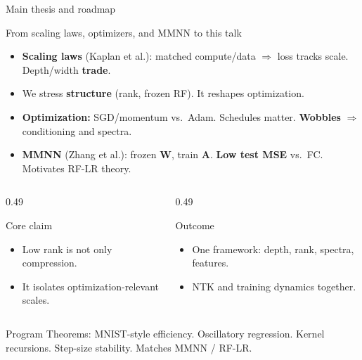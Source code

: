 \documentclass[aspectratio=169]{beamer}
\begin{document}
\begin{frame}{Main thesis and roadmap}
  \scriptsize
  \begin{block}{From scaling laws, optimizers, and MMNN to this talk}
    \begin{itemize}\setlength{\itemsep}{0.15em}
      \item \textbf{Scaling laws} (Kaplan et al.): matched compute/data $\Rightarrow$ loss tracks scale. Depth/width \textbf{trade}.
      \item We stress \textbf{structure} (rank, frozen RF). It reshapes optimization.
      \item \textbf{Optimization:} SGD/momentum vs.\ Adam. Schedules matter. \textbf{Wobbles} $\Rightarrow$ conditioning and spectra.
      \item \textbf{MMNN} (Zhang et al.): frozen $\bm{W}$, train $\bm{A}$. \textbf{Low test MSE} vs.\ FC. Motivates RF-LR theory.
    \end{itemize}
  \end{block}
  \vspace{-0.2em}
  \begin{columns}[T,onlytextwidth]
    \begin{column}{0.49\textwidth}
      \begin{exampleblock}{Core claim}
        \begin{itemize}\setlength{\itemsep}{0.1em}
          \item Low rank is not only compression.
          \item It isolates optimization-relevant scales.
        \end{itemize}
      \end{exampleblock}
    \end{column}
    \begin{column}{0.49\textwidth}
      \begin{alertblock}{Outcome}
        \begin{itemize}\setlength{\itemsep}{0.1em}
          \item One framework: depth, rank, spectra, features.
          \item NTK and training dynamics together.
        \end{itemize}
      \end{alertblock}
    \end{column}
  \end{columns}
  \vspace{-0.15em}
  \begin{block}{Program}
    \scriptsize
    Theorems: MNIST-style efficiency. Oscillatory regression. Kernel recursions. Step-size stability. Matches MMNN / RF-LR.
  \end{block}
\end{frame}
\end{document}
